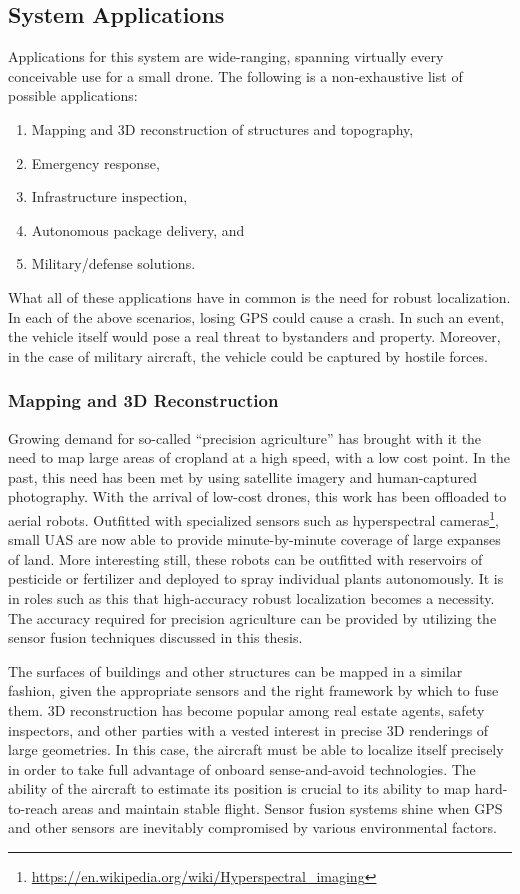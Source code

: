 \subsection{System Applications}

Applications for this system are wide-ranging, spanning virtually every conceivable use for a small drone. The following is a non-exhaustive list of possible applications:
\begin{enumerate}
    \item Mapping and 3D reconstruction of structures and topography,
    \item Emergency response,
    \item Infrastructure inspection,
    \item Autonomous package delivery, and
    \item Military/defense solutions.
\end{enumerate}
What all of these applications have in common is the need for robust localization. In each of the above scenarios, losing GPS could cause a crash. In such an event, the vehicle itself would pose a real threat to bystanders and property. Moreover, in the case of military aircraft, the vehicle could be captured by hostile forces.

\subsubsection{Mapping and 3D Reconstruction}

Growing demand for so-called ``precision agriculture'' has brought with it the need to map large areas of cropland at a high speed, with a low cost point. In the past, this need has been met by using satellite imagery and human-captured photography. With the arrival of low-cost drones, this work has been offloaded to aerial robots. Outfitted with specialized sensors such as hyperspectral cameras\footnote{\url{https://en.wikipedia.org/wiki/Hyperspectral_imaging}}, small UAS are now able to provide minute-by-minute coverage of large expanses of land. More interesting still, these robots can be outfitted with reservoirs of pesticide or fertilizer and deployed to spray individual plants autonomously. It is in roles such as this that high-accuracy robust localization becomes a necessity. The accuracy required for precision agriculture can be provided by utilizing the sensor fusion techniques discussed in this thesis.

The surfaces of buildings and other structures can be mapped in a similar fashion, given the appropriate sensors and the right framework by which to fuse them. 3D reconstruction has become popular among real estate agents, safety inspectors, and other parties with a vested interest in precise 3D renderings of large geometries. In this case, the aircraft must be able to localize itself precisely in order to take full advantage of onboard sense-and-avoid technologies. The ability of the aircraft to estimate its position is crucial to its ability to map hard-to-reach areas and maintain stable flight. Sensor fusion systems shine when GPS and other sensors are inevitably compromised by various environmental factors.

